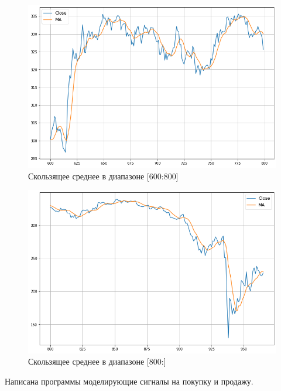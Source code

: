 \documentclass[14pt,a4paper]{extarticle}%
\begin{document}
\begin{figure}[H]
  \centering
  \includegraphics[scale=0.5]{MA_4.png}
  \caption{Скользящее среднее в диапазоне [600:800]}
  \label{fig:MA_4}
\end{figure}

\begin{figure}[H]
  \centering
  \includegraphics[scale=0.5]{MA_5.png}
  \caption{Скользящее среднее в диапазоне [800:]}
  \label{fig:MA_5}
\end{figure}

\pagebreak

Написана программы моделирующие сигналы на покупку и продажу.
\end{document}
